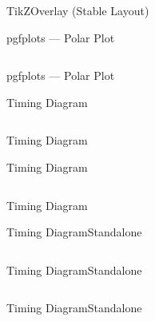 \begin{frame}{TikZ}{Overlay (Stable Layout)}
    
\end{frame}

\begin{frame}[fragile]{pgfplots --- Polar Plot}
    \begin{listing}
        \inputminted[fontsize=\tiny]{latex}{assets/tex/figures/pgfplots-polar.tex}
        \caption{Polar axis with angular and radial data}
    \end{listing}
\end{frame}

\begin{frame}{pgfplots --- Polar Plot}
    
\end{frame}

\begin{frame}[fragile]{Timing Diagram}
    \begin{listing}
        \inputminted[fontsize=\footnotesize]{latex}{assets/tex/figures/timing-inline.tex}
        \caption{Digital timing with \texttt{tikz-timing}}
    \end{listing}
\end{frame}

\begin{frame}{Timing Diagram}
    
\end{frame}

\begin{frame}[fragile]{Timing Diagram}{}
    \begin{listing}
        \inputminted[fontsize=\footnotesize]{latex}{assets/tex/figures/timing-spi.tex}
        \caption{\acs{spi} byte transfer timing}
    \end{listing}
\end{frame}

\begin{frame}{Timing Diagram}{}
    
\end{frame}

\begin{frame}[fragile]{Timing Diagram}{Standalone}
    \begin{listing}
        \inputminted[fontsize=\tiny, lastline=20]{latex}{assets/figures/i2c-timing.tex}
        \caption{Standalone \texttt{.tex} timing source from \texttt{assets/figures/} (excerpt)}
    \end{listing}
\end{frame}

\begin{frame}[fragile]{Timing Diagram}{Standalone}
    \begin{listing}
        \inputminted[fontsize=\footnotesize]{latex}{assets/tex/figures/timing-standalone.tex}
        \caption{Including the compiled standalone timing diagram}
    \end{listing}
\end{frame}

\begin{frame}{Timing Diagram}{Standalone}
    
\end{frame}
